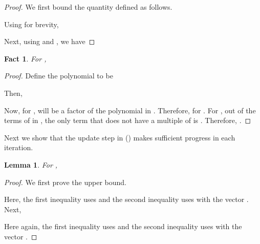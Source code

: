 \documentclass{article}[12pt]
\newtheorem{lemma}[theorem]{Lemma}
\newtheorem{fact}[theorem]{Fact}
\theoremstyle{definition}
\begin{document}
\begin{proof}
We first bound the quantity  defined as follows.

Using  for brevity,  

Next, using  and , we have 







\end{proof}

\begin{fact}
\label{fact:sjseries}
For ,   

\end{fact}

\begin{proof}
Define the polynomial  to be

Then,

Now, for ,  will be a factor of the polynomial in .
Therefore,   for .
For , out of the  terms of  in , the only term that does not have
a multiple of  is . Therefore, .
\end{proof}

Next we show that the update step in  ()
makes sufficient progress in each iteration.

\begin{lemma}
\label{lem:noofits2}
For ,

\end{lemma}


\begin{proof}
We first prove the upper bound.

Here, the first inequality uses   
and the second inequality uses 
with the vector .
Next,

Here again, the first inequality uses  
and the second inequality uses 
with the vector .

\end{proof}
\end{document}
